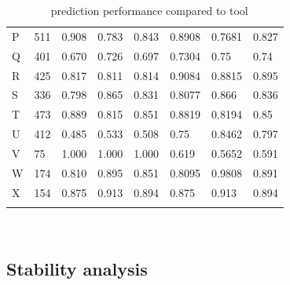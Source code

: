 \documentclass[11pt]{article} %
\begin{document}
\begin{table}[H]
{\begin{adjustbox}{max width=\textwidth,max totalheight=\textheight,keepaspectratio}
\begin{tabular}{llllHllH}
				P     & 511    &0.908& 0.783& 0.843& 0.8908      & 0.7681 & 0.827              \\
				Q     & 401    &0.670& 0.726& 0.697& 0.7304      & 0.75   & 0.74               \\
				R     & 425    &0.817& 0.811& 0.814& 0.9084      & 0.8815 & 0.895              \\
				S     & 336    &0.798& 0.865& 0.831& 0.8077      & 0.866  & 0.836              \\
				T     & 473    &0.889& 0.815& 0.851& 0.8819      & 0.8194 & 0.85               \\
				U     & 412    &0.485& 0.533& 0.508& 0.75        & 0.8462 & 0.797              \\
				V     & 75     &1.000& 1.000& 1.000& 0.619       & 0.5652 & 0.591              \\
				W     & 174    &0.810& 0.895& 0.851& 0.8095      & 0.9808 & 0.891              \\
				X     & 154    &0.875& 0.913& 0.894& 0.875       & 0.913  & 0.894              \\ \bottomrule& & & 
			\end{tabular}		
		\end{adjustbox}\\}
\caption{\OurTool~ prediction performance compared to  tool}
\end{table}

\subsection{Stability analysis}
\end{document}
